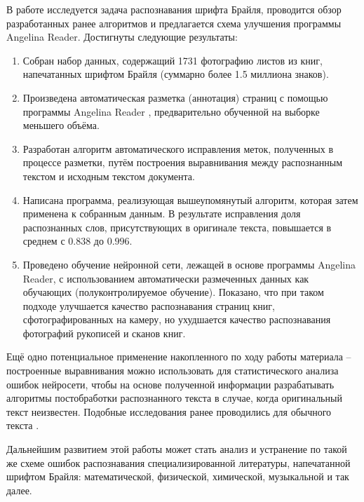 \documentclass{main.tex}[subfiles]
\begin{document}
\newpage
{}
В работе исследуется задача распознавания шрифта Брайля, проводится обзор разработанных ранее алгоритмов и предлагается схема улучшения программы Angelina Reader.
Достигнуты следующие результаты:
\begin{enumerate}[noitemsep]
    \item Собран набор данных, содержащий 1731 фотографию листов из книг, напечатанных шрифтом Брайля (суммарно более 1.5 миллиона знаков).
    \item Произведена автоматическая разметка (аннотация) страниц с помощью программы Angelina Reader \cite{ovodov2020}, предварительно обученной на выборке меньшего объёма.
    \item Разработан алгоритм автоматического исправления меток, полученных в процессе разметки, путём построения выравнивания между распознанным текстом и исходным текстом документа.
    \item Написана программа, реализующая вышеупомянутый алгоритм, которая затем применена к собранным данным.
    В результате исправления доля распознанных слов, присутствующих в оригинале текста, повышается в среднем с $ 0.838 $ до $ 0.996 $.
    \item Проведено обучение нейронной сети, лежащей в основе программы \hspace*{0pt}An\-ge\-li\-na Reader, с использованием автоматически размеченных данных как обучающих (полуконтролируемое обучение).
    Показано, что при таком подходе улучшается качество распознавания страниц книг, сфотографированных на камеру, но ухудшается качество распознавания фотографий рукописей и сканов книг.
\end{enumerate}

Ещё одно потенциальное применение накопленного по ходу работы материала -- построенные выравнивания можно использовать для статистического анализа ошибок нейросети, чтобы на основе полученной информации разрабатывать алгоритмы постобработки распознанного текста в случае, когда оригинальный текст неизвестен.
Подобные исследования ранее проводились для обычного текста \cite{nguyen2019}.

Дальнейшим развитием этой работы может стать анализ и устранение по такой же схеме ошибок распознавания специализированной литературы, напечатанной шрифтом Брайля: математической, физической, химической, музыкальной и так далее.
\end{document}
